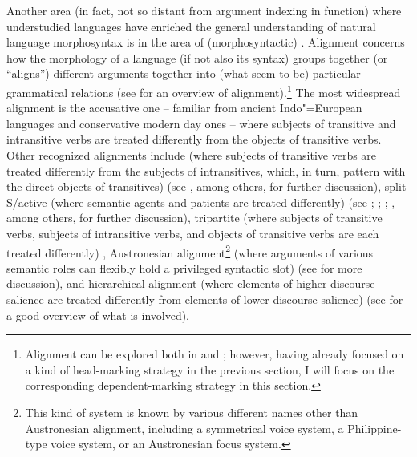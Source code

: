 \documentclass[output=paper
                ,modfonts
                ,nonflat
	        ,collection
	        ,collectionchapter
	        ,collectiontoclongg
 	        ,biblatex
                ,babelshorthands
                ,newtxmath
                ,draftmode
                ,colorlinks, citecolor=brown
]{./langsci/langscibook}
\begin{document}
{Another area (in fact, not so distant from argument indexing in function) where understudied languages have enriched the general understanding of natural language morphosyntax is in the area of (morphosyntactic) . Alignment concerns how the morphology of a language (if not also its syntax) groups together (or ``aligns'') different arguments together into (what seem to be) particular grammatical relations (see \citealt{bicknich09} for an overview of alignment).\footnote{Alignment can be explored both in  and  \citep{Nichols86a-u}; however, having already focused on a kind of head-marking strategy in the previous section, I will focus on the corresponding dependent-marking strategy in this section.} The most widespread alignment is the accusative one -- familiar from ancient Indo"=European languages and conservative modern day ones -- where subjects of transitive and intransitive verbs are treated differently from the objects of transitive verbs. Other recognized alignments include  (where subjects of transitive verbs are treated differently from the subjects of intransitives, which, in turn, pattern with the direct objects of transitives) (see \citealt{comrie78erg,plank79,dixon79,dixon94}, among others, for further discussion), split-S/active (where semantic agents and patients are treated differently) (see \citealt{klimov73,klimov74}; \citealt[Chapter 4]{dixon94}; \citealt{mithun91}; \citealt{wichdon08}, among others, for further discussion), tripartite (where subjects of transitive verbs, subjects of intransitive verbs, and objects of transitive verbs are each treated differently) \citep[39--40]{dixon94}, Austronesian alignment\footnote{This kind of system is known by various different names other than Austronesian alignment, including a symmetrical voice system, a Philippine-type voice system, or an Austronesian focus system.} (where arguments of various semantic roles can flexibly hold a privileged syntactic slot) (see \citealt{schachter76,ross02,himmelmann05typchar} for more discussion), and hierarchical alignment (where elements of higher discourse salience are treated differently from elements of lower discourse salience) (see \citealt{jacqant14} for a good overview of what is involved).    

}
\end{document}
